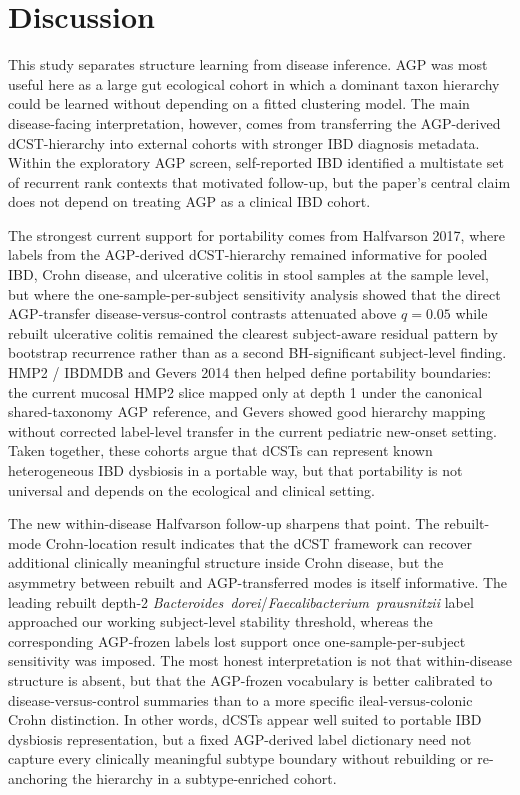 \documentclass[
  11pt,
]{article}
\begin{document}
\section{Discussion}\label{general-discussion}

This study separates structure learning from disease inference. AGP was
most useful here as a large gut ecological cohort in which a dominant
taxon hierarchy could be learned without depending on a fitted
clustering model. The main disease-facing interpretation, however, comes
from transferring the AGP-derived dCST-hierarchy into external cohorts
with stronger IBD diagnosis metadata. Within the exploratory AGP screen,
self-reported IBD identified a multistate set of recurrent rank
contexts that motivated follow-up, but the paper's central claim does not depend on
treating AGP as a clinical IBD cohort.

The strongest current support for portability comes from Halfvarson
2017, where labels from the AGP-derived dCST-hierarchy remained
informative for pooled IBD, Crohn disease, and ulcerative colitis in
stool samples at the sample level, but where the
one-sample-per-subject sensitivity analysis showed that the direct
AGP-transfer disease-versus-control contrasts attenuated above
\(q = 0.05\) while rebuilt ulcerative colitis remained the clearest
subject-aware residual pattern by bootstrap recurrence rather than as a
second BH-significant subject-level finding. HMP2 /
IBDMDB and Gevers 2014 then helped define portability boundaries: the
current mucosal HMP2 slice mapped only at depth 1 under the canonical
shared-taxonomy AGP reference, and Gevers showed good hierarchy mapping
without corrected label-level transfer in the current pediatric
new-onset setting. Taken together, these cohorts
argue that dCSTs can represent known heterogeneous IBD dysbiosis in a
portable way, but that portability is not universal and depends on the
ecological and clinical setting.

The new within-disease Halfvarson follow-up sharpens that point. The
rebuilt-mode Crohn-location result indicates that the dCST framework can
recover additional clinically meaningful structure inside Crohn disease,
but the asymmetry between rebuilt and AGP-transferred modes is itself
informative. The leading rebuilt depth-2
\emph{Bacteroides~dorei}/\emph{Faecalibacterium~prausnitzii} label
approached our working subject-level stability threshold, whereas the
corresponding AGP-frozen labels lost support once one-sample-per-subject
sensitivity was imposed. The most honest interpretation is not that
within-disease structure is absent, but that the AGP-frozen vocabulary
is better calibrated to disease-versus-control summaries than to a more
specific ileal-versus-colonic Crohn distinction. In other words, dCSTs
appear well suited to portable IBD dysbiosis representation, but a
fixed AGP-derived label dictionary need not capture every clinically
meaningful subtype boundary without rebuilding or re-anchoring the
hierarchy in a subtype-enriched cohort.
\end{document}
